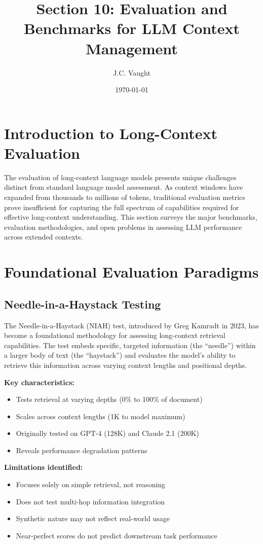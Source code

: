 \documentclass[11pt]{article}
\title{\textbf{Section 10: Evaluation and Benchmarks for LLM Context Management}}
\author{J.C. Vaught}
\date{\today}
\begin{document}
\maketitle

\section{Introduction to Long-Context Evaluation}

The evaluation of long-context language models presents unique challenges distinct from standard language model assessment. As context windows have expanded from thousands to millions of tokens, traditional evaluation metrics prove insufficient for capturing the full spectrum of capabilities required for effective long-context understanding. This section surveys the major benchmarks, evaluation methodologies, and open problems in assessing LLM performance across extended contexts.

\section{Foundational Evaluation Paradigms}

\subsection{Needle-in-a-Haystack Testing}

The Needle-in-a-Haystack (NIAH) test, introduced by Greg Kamradt in 2023, has become a foundational methodology for assessing long-context retrieval capabilities. The test embeds specific, targeted information (the ``needle'') within a larger body of text (the ``haystack'') and evaluates the model's ability to retrieve this information across varying context lengths and positional depths.

\textbf{Key characteristics:}
\begin{itemize}[leftmargin=*]
    \item Tests retrieval at varying depths (0\% to 100\% of document)
    \item Scales across context lengths (1K to model maximum)
    \item Originally tested on GPT-4 (128K) and Claude 2.1 (200K)
    \item Reveals performance degradation patterns
\end{itemize}

\textbf{Limitations identified:}
\begin{itemize}[leftmargin=*]
    \item Focuses solely on simple retrieval, not reasoning
    \item Does not test multi-hop information integration
    \item Synthetic nature may not reflect real-world usage
    \item Near-perfect scores do not predict downstream task performance
\end{itemize}
\end{document}
